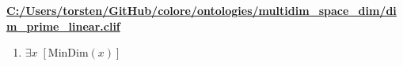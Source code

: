 \documentclass{article}
\begin{document}
\textbf{\url{C:/Users/torsten/GitHub/colore/ontologies/multidim\_space\_dim/dim\_prime\_linear.clif}}

\begin{enumerate}
\item $\exists x\;  \left[ \textrm{MinDim}(x) \right]$
\end{enumerate}
\end{document}
